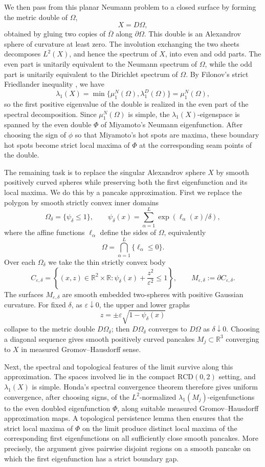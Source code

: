 \documentclass[11pt]{amsart}
\numberwithin{equation}{section}
\newcommand{\R}{\mathbb R}
\newcommand{\Om}{\Omega}
\newcommand{\eps}{\varepsilon}
\newcommand{\RCD}{\mathrm{RCD}}
\begin{document}
We then pass from this planar Neumann problem to a closed surface by forming the
metric double of $\Om$,
\[
X=D\Om,
\]
obtained by gluing two copies of $\overline\Om$ along $\partial\Om$.  This double
is an Alexandrov sphere of curvature at least zero.  The involution exchanging
the two sheets decomposes $L^2(X)$, and hence the spectrum of $X$, into even and
odd parts.  The even part is unitarily equivalent to the Neumann spectrum of
$\Om$, while the odd part is unitarily equivalent to the Dirichlet spectrum of
$\Om$.  By Filonov's strict Friedlander inequality \cite{Filonov}, we have
\[
\lambda_1(X)
=
\min\{\mu_1^N(\Om),\lambda_1^D(\Om)\}
=
\mu_1^N(\Om),
\]
so the first positive eigenvalue of the double is realized in the even part of
the spectral decomposition.  Since $\mu_1^N(\Om)$ is simple, the
$\lambda_1(X)$-eigenspace is spanned by the even double $\Phi$ of Miyamoto's
Neumann eigenfunction.  After choosing the sign of $\phi$ so that Miyamoto's hot
spots are maxima, these boundary hot spots become strict local maxima of $\Phi$
at the corresponding seam points of the double.

The remaining task is to replace the singular Alexandrov sphere $X$ by smooth
positively curved spheres while preserving both the first eigenfunction and its
local maxima.  We do this by a pancake approximation.  First we replace the
polygon by smooth strictly convex inner domains
\[
\Om_\delta=\{\psi_\delta\le 1\},
\qquad
\psi_\delta(x)=\sum_{\alpha=1}^{L} \exp(\ell_\alpha(x)/\delta),
\]
where the affine functions $\ell_\alpha$ define the sides of $\Om$, equivalently
\[
\Om=\bigcap_{\alpha=1}^{L}\{\ell_\alpha\le 0\}.
\]
Over each $\Om_\delta$ we take the thin strictly convex body
\[
C_{\eps,\delta}
=
\left\{(x,z)\in\R^2\times\R:
\psi_\delta(x)+\frac{z^2}{\eps^2}\le 1
\right\},
\qquad
M_{\eps,\delta}:=\partial C_{\eps,\delta}.
\]
The surfaces $M_{\eps,\delta}$ are smooth embedded two-spheres with positive
Gaussian curvature.  For fixed $\delta$, as $\eps\downarrow0$, the upper and
lower graphs
\[
z=\pm \eps\sqrt{1-\psi_\delta(x)}
\]
collapse to the metric double $D\Om_\delta$; then $D\Om_\delta$ converges to
$D\Om$ as $\delta\downarrow0$.  Choosing a diagonal sequence gives smooth
positively curved pancakes $M_j\subset\R^3$ converging to $X$ in measured
Gromov--Hausdorff sense.

Next, the spectral and topological features of the limit survive along this
approximation.  The spaces involved lie in the compact $\RCD(0,2)$ setting, and
$\lambda_1(X)$ is simple.  Honda's spectral convergence theorem \cite{Honda}
therefore gives uniform convergence, after choosing signs, of the
$L^2$-normalized $\lambda_1(M_j)$-eigenfunctions to the even doubled eigenfunction
$\Phi$, along suitable measured Gromov--Hausdorff approximation maps.  A
topological persistence lemma then ensures that the strict local maxima of
$\Phi$ on the limit produce distinct local maxima of the corresponding first
eigenfunctions on all sufficiently close smooth pancakes.  More precisely, the
argument gives pairwise disjoint regions on a smooth pancake on which the first
eigenfunction has a strict boundary gap.
\end{document}
